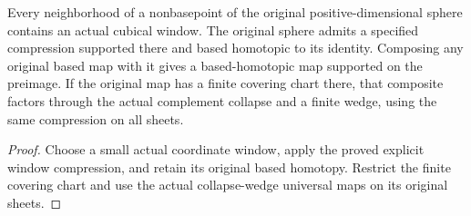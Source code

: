 \begin{proposition}
  \label{prop:actual-sphere-supported-compression}
  \leanok
  Every neighborhood of a nonbasepoint of the original positive-dimensional sphere contains an actual cubical window. The original sphere admits a specified compression supported there and based homotopic to its identity. Composing any original based map with it gives a based-homotopic map supported on the preimage. If the original map has a finite covering chart there, that composite factors through the actual complement collapse and a finite wedge, using the same compression on all sheets.
\end{proposition}
\begin{proof}
  Choose a small actual coordinate window, apply the proved explicit window compression, and retain its original based homotopy. Restrict the finite covering chart and use the actual collapse-wedge universal maps on its original sheets.
  \leanok
\end{proof}

